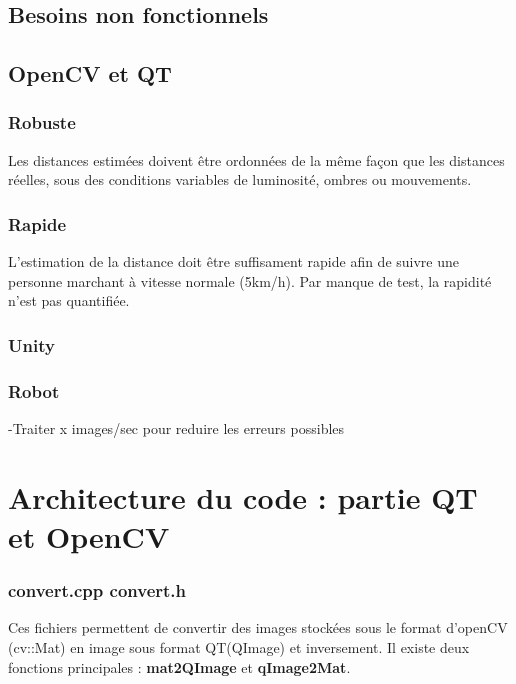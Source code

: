 \documentclass[a4paper]{article}
\begin{document}
\subsection{Besoins non fonctionnels}

\subsection*{OpenCV et QT}

\subsubsection*{Robuste}

Les distances estimées doivent être ordonnées de la même façon que les distances
réelles, sous des conditions variables de luminosité, ombres ou mouvements.

\subsubsection*{Rapide}

L'estimation de la distance doit être suffisament rapide afin de suivre une personne
marchant à vitesse normale (5km/h). Par manque de test, la rapidité n'est pas quantifiée.

\subsubsection*{Unity}


\subsubsection{Robot}
-Traiter x images/sec pour reduire les erreurs possibles



\section{Architecture du code : partie QT et OpenCV}

\subsubsection*{convert.cpp convert.h}

Ces fichiers permettent de convertir des images stockées sous le format d'openCV
(cv::Mat) en image sous format QT(QImage) et inversement. Il existe deux fonctions
principales : \textbf{mat2QImage} et \textbf{qImage2Mat}.
\end{document}
